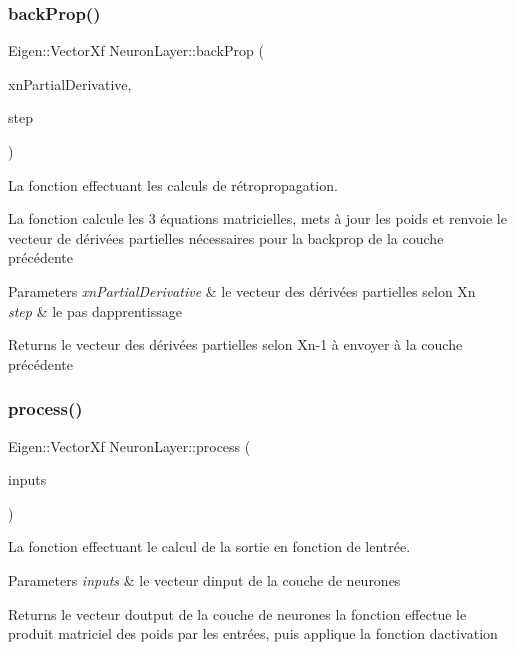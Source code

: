 \subsubsection{\texorpdfstring{back\+Prop()}{backProp()}}
{\footnotesize\ttfamily Eigen\+::\+Vector\+Xf Neuron\+Layer\+::back\+Prop (\begin{DoxyParamCaption}\item[{Eigen\+::\+Vector\+Xf}]{xn\+Partial\+Derivative,  }\item[{float}]{step }\end{DoxyParamCaption})}



La fonction effectuant les calculs de rétropropagation. 

La fonction calcule les 3 équations matricielles, mets à jour les poids et renvoie le vecteur de dérivées partielles nécessaires pour la backprop de la couche précédente 
\begin{DoxyParams}{Parameters}
{\em xn\+Partial\+Derivative} & le vecteur des dérivées partielles selon Xn \\
\hline
{\em step} & le pas d\textquotesingle{}apprentissage \\
\hline
\end{DoxyParams}
\begin{DoxyReturn}{Returns}
le vecteur des dérivées partielles selon Xn-\/1 à envoyer à la couche précédente 
\end{DoxyReturn}
\mbox{\label{classNeuronLayer_aa374ba7d040ae618b5037aa88e5efae7}} 
\subsubsection{\texorpdfstring{process()}{process()}}
{\footnotesize\ttfamily Eigen\+::\+Vector\+Xf Neuron\+Layer\+::process (\begin{DoxyParamCaption}\item[{Eigen\+::\+Vector\+Xf}]{inputs }\end{DoxyParamCaption})}



La fonction effectuant le calcul de la sortie en fonction de l\textquotesingle{}entrée. 


\begin{DoxyParams}{Parameters}
{\em inputs} & le vecteur d\textquotesingle{}input de la couche de neurones \\
\hline
\end{DoxyParams}
\begin{DoxyReturn}{Returns}
le vecteur d\textquotesingle{}output de la couche de neurones la fonction effectue le produit matriciel des poids par les entrées, puis applique la fonction d\textquotesingle{}activation 
\end{DoxyReturn}


